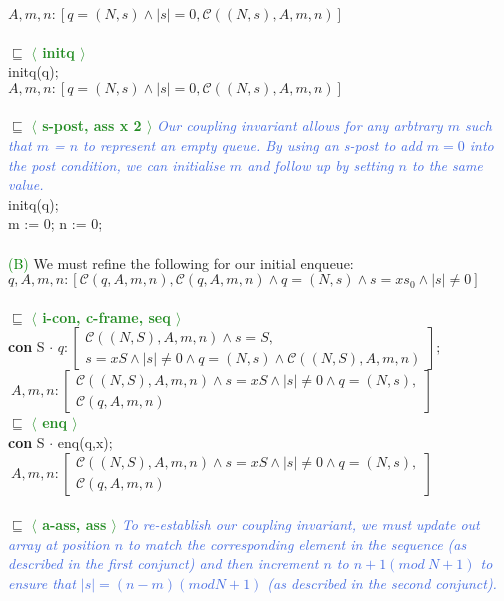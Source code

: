 \documentclass[a4paper]{scrartcl}
\newcommand{\C}{\mathcal{C}}
\newcommand{\refinedby}{\sqsubseteq} %
\newcommand{\rc}[1]{ $\refinedby$ \quad \textbf{\textcolor{ForestGreen}{$\langle$ #1 $\rangle$}}}
\newcommand{\explain}[1]{\textcolor{RoyalBlue}{\textit{#1}}}
\newcommand{\tabb}{\null \quad}
\begin{document}
{$A, m, n : [ q = (N,s) \land |s| = 0, \C((N,s),A,m,n)]$ \\ \\
\rc{initq} \\
initq(q); \\
$A, m, n : [ q = (N,s) \land |s| = 0, \C((N,s),A,m,n)]$ \\  \\
\rc{s-post, ass x 2} \explain{Our coupling invariant allows for any arbtrary $m$ such that $m$ = $n$ to represent an empty queue. By using an s-post to add $m = 0$ into the post condition, we can initialise $m$ and follow up by setting $n$ to the same value.} \\
initq(q); \\
m := 0; n := 0; \\ \\
%
%
\textcolor{green}{(B)}
We must refine the following for our initial enqueue: \\ 
$q, A, m, n : [\C(q,A,m,n), \C(q,A,m,n) \land q = (N,s) \land s = xs_0 \land |s| \neq 0]$ \\ \\
%
%
\rc{i-con, c-frame, seq} \\
\textbf{con } S $\cdot$ $q : \left[
\begin{array}{l}
\C((N,S),A,m,n) \land s = S, \\
s = xS \land |s| \neq 0 \land q = (N,s) \land \C((N,S),A,m,n)
\end{array}
\right];$ \\
%
%
\tabb $~A, m, n : \left[
\begin{array}{l}
\C((N,S),A,m,n) \land  s = xS \land |s| \neq 0 \land q = (N,s), \\
\C(q,A,m,n) 
\end{array}
\right]$ \\
%
%
\rc{enq} \\
\textbf{con } S $\cdot$ enq(q,x);\\
\tabb $~A, m, n : \left[
\begin{array}{l}
\C((N,S),A,m,n) \land  s = xS \land |s| \neq 0 \land q = (N,s), \\
\C(q,A,m,n) 
\end{array}
\right]$ \\ \\
%
%
\rc{a-ass, ass} \explain{To re-establish our coupling invariant, we must update out array at position $n$ to match the corresponding element in the sequence (as described in the first conjunct) and then increment $n$ to $n + 1 (mod~N+1)$ to ensure that $|s| = (n - m)(mod N + 1)$ (as described in the second conjunct).} \\
}
\end{document}
